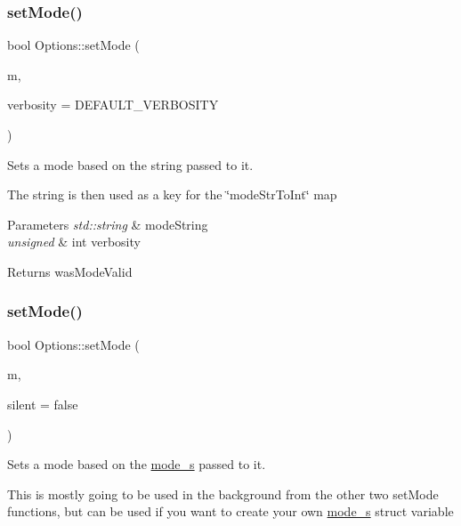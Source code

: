 \subsubsection{\texorpdfstring{setMode()}{setMode()}\hspace{0.1cm}{\footnotesize\ttfamily [4/6]}}
{\footnotesize\ttfamily bool Options\+::set\+Mode (\begin{DoxyParamCaption}\item[{std\+::string}]{m,  }\item[{unsigned int}]{verbosity = {\ttfamily DEFAULT\+\_\+VERBOSITY} }\end{DoxyParamCaption})}



Sets a mode based on the string passed to it. 

The string is then used as a key for the \char`\"{}mode\+Str\+To\+Int\char`\"{} map


\begin{DoxyParams}{Parameters}
{\em std\+::string} & mode\+String \\
\hline
{\em unsigned} & int verbosity\\
\hline
\end{DoxyParams}
\begin{DoxyReturn}{Returns}
was\+Mode\+Valid 
\end{DoxyReturn}
\mbox{\label{classOptions_a76e0100b6a554382ee6bc7d5795e6062}} 
\subsubsection{\texorpdfstring{setMode()}{setMode()}\hspace{0.1cm}{\footnotesize\ttfamily [5/6]}}
{\footnotesize\ttfamily bool Options\+::set\+Mode (\begin{DoxyParamCaption}\item[{\mbox{\hyperlink{structmode__s}{mode\+\_\+s}}}]{m,  }\item[{bool}]{silent = {\ttfamily false} }\end{DoxyParamCaption})}



Sets a mode based on the \mbox{\hyperlink{structmode__s}{mode\+\_\+s}} passed to it. 

This is mostly going to be used in the background from the other two set\+Mode functions, but can be used if you want to create your own \mbox{\hyperlink{structmode__s}{mode\+\_\+s}} struct variable

